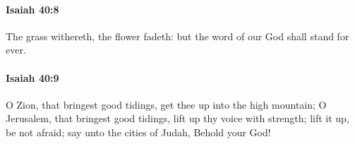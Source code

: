 		\paragraph{Isaiah 40:8} %
			\label{ISAIAH-40-8}

			The grass withereth, the flower fadeth: but the word of our God shall stand for ever.


		\paragraph{Isaiah 40:9} %
			\label{ISAIAH-40-9}

			O Zion, that bringest good tidings, get thee up into the high mountain; O Jerusalem, that bringest good tidings, lift up thy voice with strength; lift it up, be not afraid; say unto the cities of Judah, Behold your God!



